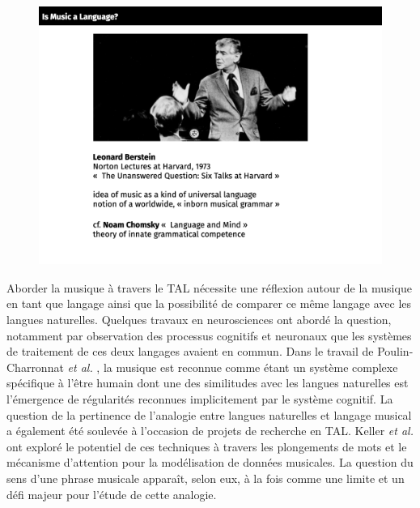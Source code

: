 \begin{figure}[!h]
	\centering
	\includegraphics[height=85mm, width=120mm]{z_images/1_contexte/0_Bernstein.png}
\end{figure}

Aborder la musique à travers le TAL nécessite une réflexion autour de la
musique en tant que langage ainsi que la possibilité de comparer ce même
langage avec les langues naturelles. Quelques travaux en neurosciences ont
abordé la question, notamment par observation des processus cognitifs et
neuronaux que les systèmes de traitement de ces deux langages avaient en
commun. Dans le travail de Poulin-Charronnat \textit{et al.}
\cite{poulincharronnat:hal-01985213}, la musique est reconnue comme étant un
système complexe spécifique à l’être humain dont une des similitudes avec les
langues naturelles est l’émergence de régularités reconnues implicitement par
le système cognitif. La question de la pertinence de l’analogie entre langues
naturelles et langage musical a également été soulevée à l’occasion de projets
de recherche en TAL. Keller \textit{et al.} \cite{keller:hal-03279850} ont
exploré le potentiel de ces techniques à travers les plongements de mots et le
mécanisme d’attention pour la modélisation de données musicales. La question du
sens d’une phrase musicale apparaît, selon eux, à la fois comme une limite et
un défi majeur pour l’étude de cette analogie.


